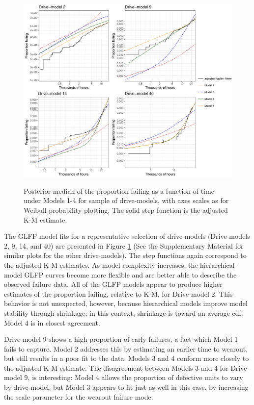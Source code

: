 \documentclass[11pt]{article}
\begin{document}
\begin{figure}[H]
{\centering
\includegraphics[width=\textwidth]{single-drive-4-Models-ex-v2}}
\caption{\footnotesize Posterior median of the proportion failing as a function of time under Models 1-4 for sample of drive-models, with axes scales as for Weibull probability plotting.  The solid step function is the adjusted K-M estimate.}
\label{fig:mod_comp_leg}
\end{figure}

The GLFP model fits for a representative selection of drive-models (Drive-models 2, 9, 14, and 40) are presented in Figure \ref{fig:mod_comp_leg} (See the Supplementary Material for similar plots for the other drive-models).  The step functions again correspond to the adjusted K-M estimates.  As model complexity increases, the hierarchical-model GLFP curves become more flexible and are better able to describe the observed failure data.  All of the GLFP models appear to produce higher estimates of the proportion failing, relative to K-M, for Drive-model 2. This behavior is not unexpected, however, because hierarchical models improve model stability through shrinkage; in this context, shrinkage is toward an average cdf. Model 4 is in closest agreement. 

Drive-model 9 shows a high proportion of early failures, a fact which Model 1 fails to capture. Model 2 addresses this by estimating an earlier time to wearout, but still results in a poor fit to the data. Models 3 and 4 conform more closely to the adjusted K-M estimate. The disagreement between Models 3 and 4 for Drive-model 9, is interesting: Model 4 allows the proportion of defective units to vary by drive-model, but Model 3 appears to fit just as well in this case, by increasing the scale parameter for the wearout failure mode.
\end{document}
